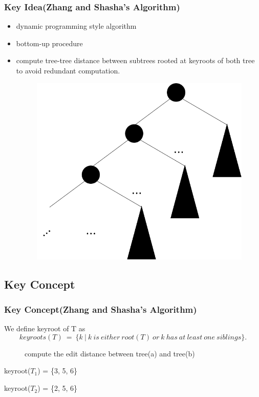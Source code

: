 \documentclass{beamer}
\begin{document}
\begin{frame}
\frametitle{Key Idea(Zhang and Shasha's Algorithm)}
\begin{itemize}
\item dynamic programming style algorithm
\item bottom-up procedure
\item compute tree-tree distance between subtrees rooted at keyroots of both tree to avoid redundant computation.
\begin{figure}
	\includegraphics[width=0.5\linewidth]{bottomup}
	\label{Implications} 
	\centering
\end{figure}
\end{itemize}
\end{frame}


\subsection{Key Concept}
\begin{frame}
\frametitle{Key Concept(Zhang and Shasha's Algorithm)}
We define keyroot of T as
\begin{displaymath}
keyroots(T)\ =\ \{k\ |\ k\ is\ either\ root(T)\ or\ k\ has\ at\ least\ one\ siblings\}.
\end{displaymath} 
\begin{figure}
	\centering  
		{  
		}
		\caption{compute the edit distance between tree(a) and tree(b)}
\end{figure}
keyroot($T_1$) = \{3, 5, 6\}

keyroot($T_2$) = \{2, 5, 6\}
\end{frame}
\end{document}
